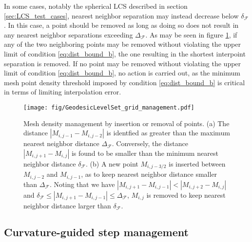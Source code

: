 In some cases, notably the spherical LCS described in section \ref{sec:LCS_test_cases}, nearest neighbor separation may instead decrease below $\delta_{\mathcal{F}}$. In this case, a point should be removed as long as doing so does not result in any nearest neighbor separations exceeding $\Delta_{\mathcal{F}}$. As may be seen in figure \ref{fig:grid_management}, if any of the two neighboring points may be removed without violating the upper limit of condition \eqref{eq:dist_bound_b}, the one resulting in the shortest interpoint separation is removed. If no point may be removed without violating the upper limit of condition \eqref{eq:dist_bound_b}, no action is carried out, as the minimum mesh point density threshold imposed by condition \eqref{eq:dist_bound_b} is critical in terms of limiting interpolation error.

\begin{figure}[h!] 
\centering
\texttt{[image: fig/GeodesicLevelSet\_grid\_management.pdf]}
\caption{Mesh density management by insertion or removal of points. (a) The distance $\left|M_{i,j-1}-M_{i,j-2}\right|$ is identfied as greater than the maximum nearest neighbor distance $\Delta_{\mathcal{F}}$. Conversely, the distance $\left|M_{i,j+1}-M_{i,j}\right|$ is found to be smaller than the minimum nearest neighbor distance $\delta_{\mathcal{F}}$. (b) A new point $M_{i,j-3/2}$ is inserted between $M_{i,j-2}$ and $M_{i,j-1}$, as to keep nearest neighbor distance smaller than $\Delta_{\mathcal{F}}$. Noting that we have $\left|M_{i,j+1}-M_{i,j-1}\right|<\left|M_{i,j+2}-M_{i,j}\right|$ and $\delta_{\mathcal{F}}\leq\left|M_{i,j+1}-M_{i,j-1}\right|\leq\Delta_{\mathcal{F}}$, $M_{i,j}$ is removed to keep nearest neighbor distance larger than $\delta_{\mathcal{F}}$.}\label{fig:grid_management}
\end{figure}

\subsection{Curvature-guided step management}\label{sec:step_management}

